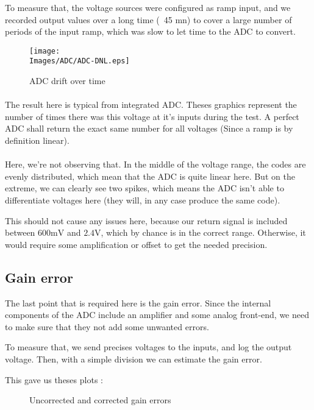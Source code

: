 To measure that, the voltage sources were configured as ramp input, and we recorded output values over
a long time (~45 mn) to cover a large number of periods of the input ramp, which was slow to let time
to the ADC to convert.

\begin{figure}[!hbt]
    \centering
    \texttt{[image: \\Images/ADC/ADC-DNL.eps]}
    \caption{ADC drift over time}
\end{figure}
\FloatBarrier

\paragraph{}
The result here is typical from integrated ADC. Theses graphics represent the number of times there was this
voltage at it's inputs during the test.
A perfect ADC shall return the exact same number for all voltages (Since a ramp is by definition linear).

\paragraph{}
Here, we're not observing that. In the middle of the voltage range, the codes are evenly distributed, which
mean that the ADC is quite linear here. But on the extreme, we can clearly see two spikes, which means the ADC
isn't able to differentiate voltages here (they will, in any case produce the same code).

This should not cause any issues here, because our return signal is included between $600 \si{\milli\volt}$
and $2.4 \si{\volt}$, which by chance is in the correct range. Otherwise, it would require some amplification
or offset to get the needed precision.


\FloatBarrier
\subsection{Gain error}
The last point that is required here is the gain error. Since the internal components of the ADC include
an amplifier and some analog front-end, we need to make sure that they not add some unwanted errors.

To measure that, we send precises voltages to the inputs, and log the output voltage.
Then, with a simple division we can estimate the gain error.

This gave us theses plots :
\begin{figure}
    \centering
    \qquad
    \caption{Uncorrected and corrected gain errors}%
\end{figure}
\FloatBarrier



